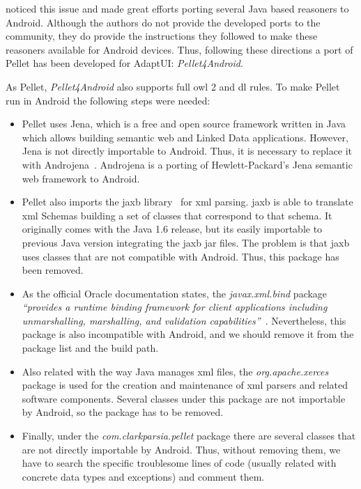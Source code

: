 \citet{yus_android_2013} noticed this issue and made great efforts porting
several Java based reasoners to Android. Although the authors do not provide the
developed ports to the community, they do provide the instructions they followed
to make these reasoners available for Android devices. Thus, following these
directions a port of Pellet has been developed for AdaptUI: \textit{Pellet4Android}.

As Pellet, \textit{Pellet4Android} also supports full \ac{owl} 2 and \ac{dl} 
rules. To make Pellet run in Android the following steps were needed:

\begin{itemize}
  \item Pellet uses Jena, which is a free and open source framework written in
  Java which allows building semantic web and Linked Data applications. However,
  Jena is not directly importable to Android. Thus, it is necessary to replace it
  with Androjena~\citep{androjena}. Androjena is a porting of Hewlett-Packard's
  Jena semantic web framework to Android. 
  
  \item Pellet also imports the \ac{jaxb} library~\citep{jaxb} for \ac{xml} 
  parsing. \ac{jaxb} is able to translate \ac{xml} Schemas building a set of 
  classes that correspond to that schema. It originally comes with the Java 1.6 
  release, but its easily importable to previous Java version integrating the 
  \ac{jaxb} jar files. The problem is that \ac{jaxb} uses classes that are not 
  compatible with Android. Thus, this package has been removed. 
  
  \item As the official Oracle documentation states, the \textit{javax.xml.bind}
  package \textit{``provides a runtime binding framework for client applications
  including unmarshalling, marshalling, and validation capabilities''}~\citep{javax_xml_bind}.
  Nevertheless, this package is also incompatible with Android, and we should
  remove it from the package list and the build path.
  
  \item Also related with the way Java manages \ac{xml} files, the 
  \textit{org.apache.xerces}~\citep{xerces} package is used for the creation and 
  maintenance of \ac{xml} parsers and related software components. Several 
  classes under this package are not importable by Android, so the package has 
  to be removed.
  
  \item Finally, under the \textit{com.clarkparsia.pellet} package there are several
  classes that are not directly importable by Android. Thus, without removing them,
  we have to search the specific troublesome lines of code (usually related with
  concrete data types and exceptions) and comment them. 
\end{itemize}

